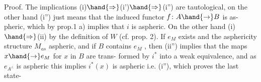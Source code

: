 Proof. The implications (i)$\hand{\Rightarrow}$(i')$\hand{\Rightarrow}$(i'') are tautological, on
the other hand (i'') just means that the induced functor $f\colon A\hand{\to} B$ is as-%
pheric, which by prop.1 a) implies that $i$ is aspheric. On the other
hand (i)$\hand{\Rightarrow}$(ii) by the definition of $W$ (cf. prop. 2). If $e_M$ exists
and  the asphericity structure $M_{as}$  aspheric, and if $B$ contains $e_M$ ,
then (ii'') implies that the maps $x\hand{\to} e_M$ for $x$ in $B$  are trans-%
formed by $i^{*}$ into a weak equivalence, and as $e_{A^{\wedge}}$ is aspheric this
implies $i^{*}(x)$ is aspheric i.e. (i''), which  proves the last state-%

